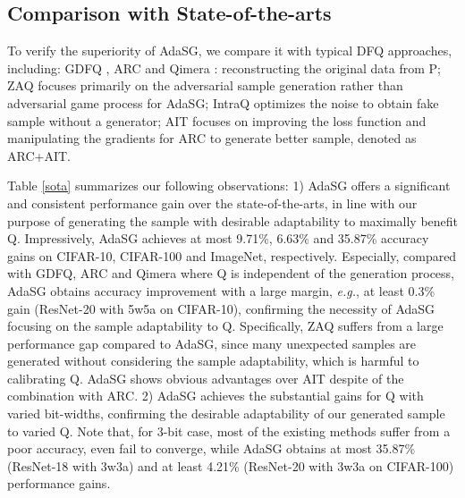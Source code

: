 \subsection{Comparison with State-of-the-arts}
To verify the superiority of AdaSG, we compare it with typical DFQ approaches, including: GDFQ \cite{xu2020generative}, ARC \cite{zhu2021autorecon} and Qimera \cite{choi2021qimera}: reconstructing the original data from P; ZAQ \cite{liu2021zero}  focuses primarily on the adversarial sample generation rather than adversarial game process for AdaSG; IntraQ \cite{zhong2022intraq} optimizes the noise to obtain fake sample without a generator; AIT \cite{choi2022s} focuses on improving the loss function and manipulating the gradients for ARC to generate better sample, denoted as ARC+AIT.

Table \ref{sota} summarizes our following observations: 1) AdaSG offers a significant and consistent performance gain over the state-of-the-arts, in line with our purpose of generating the sample with desirable adaptability to maximally benefit Q. Impressively, AdaSG achieves at most 9.71\%, 6.63\% and 35.87\% accuracy gains on CIFAR-10, CIFAR-100 and ImageNet, respectively. Especially, compared with GDFQ, ARC and Qimera where Q is independent of the generation process, AdaSG obtains accuracy improvement with a large margin, \emph{e.g.}, at least 0.3\% gain (ResNet-20 with 5w5a on CIFAR-10), confirming the necessity of AdaSG focusing on the sample adaptability to Q.   Specifically, ZAQ suffers from a large performance gap compared to AdaSG, since many unexpected samples are generated without considering the sample adaptability, which is harmful to calibrating Q.  AdaSG shows obvious advantages over AIT despite of the combination with ARC.
2) AdaSG achieves the substantial gains for Q with varied bit-widths, confirming the desirable adaptability of our generated sample to varied Q. Note that, for 3-bit case, most of the existing methods suffer from a poor accuracy, even fail to converge, while AdaSG obtains at most 35.87\% (ResNet-18 with 3w3a) and at least 4.21\% (ResNet-20 with 3w3a on CIFAR-100) performance gains.



